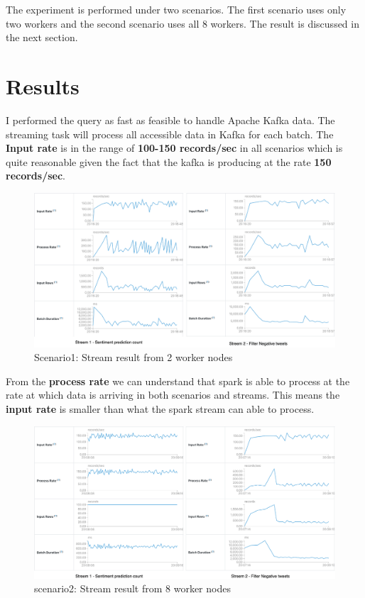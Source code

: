 \documentclass[12pt,a4paper]{report}
\begin{document}
The experiment is performed under two scenarios. The first scenario uses only two workers and the second scenario uses all 8 workers. The result is discussed in the next section.
\section{Results}
I performed the query as fast as feasible to handle Apache Kafka data. The streaming task will process all accessible data in Kafka for each batch. The \textbf{Input rate} is in the range of \textbf{100-150 records/sec} in all scenarios which is quite reasonable given the fact that the kafka is producing at the rate \textbf{150 records/sec}.\\

\begin{figure}[H]
    \centering
\includegraphics[width=1\textwidth]{images/worker2results.drawio.png}
    \caption{Scenario1: Stream result from 2 worker nodes}
    \label{fig:workers2}
\end{figure}

From the \textbf{process rate} we can understand that spark is able to process at the rate at which data is arriving in both scenarios and streams. This means the \textbf{input rate} is smaller than what the spark stream can able to process. 

\begin{figure}[H]
    \centering
\includegraphics[width=1\textwidth]{images/worker8result.drawio.png}
    \caption{scenario2: Stream result from 8 worker nodes}
    \label{fig:workers8}
\end{figure}
\end{document}
